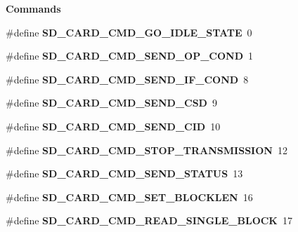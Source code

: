 \begin{Indent}\textbf{ Commands}\par
\begin{DoxyCompactItemize}
\item 
\mbox{\label{spi-sd-card_8c_abf34f416f11cdd08c542e01b396dafa8}} 
\#define {\bfseries S\+D\+\_\+\+C\+A\+R\+D\+\_\+\+C\+M\+D\+\_\+\+G\+O\+\_\+\+I\+D\+L\+E\+\_\+\+S\+T\+A\+TE}~0
\item 
\mbox{\label{spi-sd-card_8c_af32f3beb66789ef47b51109cded7e615}} 
\#define {\bfseries S\+D\+\_\+\+C\+A\+R\+D\+\_\+\+C\+M\+D\+\_\+\+S\+E\+N\+D\+\_\+\+O\+P\+\_\+\+C\+O\+ND}~1
\item 
\mbox{\label{spi-sd-card_8c_a4ecb5e9f0dcd2ff92e3b4e922f3afac4}} 
\#define {\bfseries S\+D\+\_\+\+C\+A\+R\+D\+\_\+\+C\+M\+D\+\_\+\+S\+E\+N\+D\+\_\+\+I\+F\+\_\+\+C\+O\+ND}~8
\item 
\mbox{\label{spi-sd-card_8c_a6b588f4b63756d237396fa4c9143b5ae}} 
\#define {\bfseries S\+D\+\_\+\+C\+A\+R\+D\+\_\+\+C\+M\+D\+\_\+\+S\+E\+N\+D\+\_\+\+C\+SD}~9
\item 
\mbox{\label{spi-sd-card_8c_aa6b39819cee88eeb2e361f3043d0587f}} 
\#define {\bfseries S\+D\+\_\+\+C\+A\+R\+D\+\_\+\+C\+M\+D\+\_\+\+S\+E\+N\+D\+\_\+\+C\+ID}~10
\item 
\mbox{\label{spi-sd-card_8c_a9c5c82e23285a5b280c46202b87df393}} 
\#define {\bfseries S\+D\+\_\+\+C\+A\+R\+D\+\_\+\+C\+M\+D\+\_\+\+S\+T\+O\+P\+\_\+\+T\+R\+A\+N\+S\+M\+I\+S\+S\+I\+ON}~12
\item 
\mbox{\label{spi-sd-card_8c_aad4285d2769d289d977e8af4edce755f}} 
\#define {\bfseries S\+D\+\_\+\+C\+A\+R\+D\+\_\+\+C\+M\+D\+\_\+\+S\+E\+N\+D\+\_\+\+S\+T\+A\+T\+US}~13
\item 
\mbox{\label{spi-sd-card_8c_affd2c4d9c1455767fdfb76be0675c846}} 
\#define {\bfseries S\+D\+\_\+\+C\+A\+R\+D\+\_\+\+C\+M\+D\+\_\+\+S\+E\+T\+\_\+\+B\+L\+O\+C\+K\+L\+EN}~16
\item 
\mbox{\label{spi-sd-card_8c_a5d37888707a6d5a83b3f2659b3a286e3}} 
\#define {\bfseries S\+D\+\_\+\+C\+A\+R\+D\+\_\+\+C\+M\+D\+\_\+\+R\+E\+A\+D\+\_\+\+S\+I\+N\+G\+L\+E\+\_\+\+B\+L\+O\+CK}~17

\end{DoxyCompactItemize}
\end{Indent}
